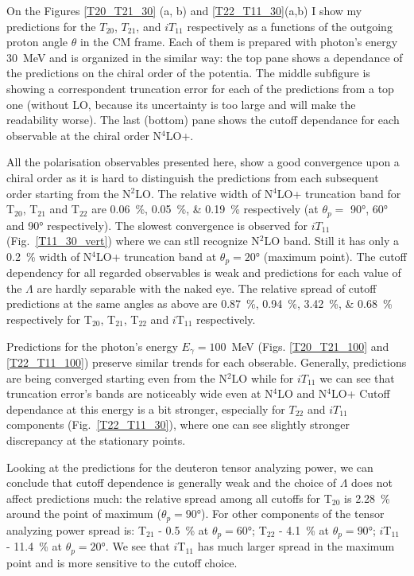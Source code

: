     On the Figures \ref{T20_T21_30} (a, b) and \ref{T22_T11_30}(a,b)
    I show my predictions for the
    $T_{20}$, $T_{21}$,  and $iT_{11}$ respectively as a functions 
    of the outgoing proton angle $\theta$ in the CM frame. Each of them
    is prepared with photon's energy 30~MeV and is
    organized in the similar way: the top
    pane shows a dependance of the predictions on the 
    chiral order of the potentia. The middle subfigure is
    showing a correspondent truncation error for each of the 
    predictions from a top one (without LO, because its uncertainty is
    too large and will make the readability worse). The last (bottom)
    pane shows the cutoff dependance for each observable at the chiral
    order N$^4$LO+. 

    All the polarisation observables presented here, show a good convergence 
    upon a chiral order as it is hard to distinguish the predictions
    from each subsequent order starting from the N$^2$LO.
    The relative width of N$^4$LO+ truncation band 
    for T$_{20}$, T$_{21}$ and T$_{22}$
    are \SIlist{0.06; 0.05; 0.19}{\percent} respectively (at $\theta_p=$ \ang{90}, \ang{60} and \ang{90} respectively).
    The slowest convergence is observed for $iT_{11}$ (Fig.~\ref{T11_30_vert})
    where we can stll recognize N$^2$LO band.
    Still it has only a \SI{0.2}{\percent}
    width of N$^4$LO+ truncation band at $\theta_p = \ang{20}$ (maximum point).
    The cutoff dependency for all regarded observables is weak and 
    predictions for each value of the $\Lambda$ are hardly separable 
    with the naked eye.
    The relative spread of cutoff predictions at the same angles as above 
    are \SIlist{0.87; 0.94; 3.42; 0.68}{\percent} respectively for T$_{20}$, T$_{21}$, T$_{22}$ and $i\text{T}_{11}$ respectively.


    Predictions for the photon's energy $E_\gamma = 100$~MeV
    (Figs. \ref{T20_T21_100} and \ref{T22_T11_100}) preserve similar
    trends for each obserable. 
    Generally, predictions are being converged starting
    even from the N$^2$LO while for $iT_{11}$
    we can see 
    that truncation error's bands are noticeably wide
    even at N$^4$LO and N$^4$LO+
    Cutoff dependance at this energy is a bit stronger, especially
    for 
    $T_{22}$ and $iT_{11}$ components (Fig.~\ref{T22_T11_30}),
    where one can see 
    slightly stronger discrepancy at the stationary points.
    
    Looking at the predictions for the deuteron tensor analyzing power,
    we can conclude that cutoff dependence is generally weak
    and the choice of $\Lambda$ does not affect predictions much:
    the relative spread among all cutoffs for T$_{20}$ is \SI{2.28}{\percent}
    around the point of maximum ($\theta_p = \ang{90}$).
    For other components of the tensor analyzing power spread is:
    T$_{21}$ - \SI{0.5}{\percent} at $\theta_p = \ang{60}$;
    T$_{22}$ - \SI{4.1}{\percent} at $\theta_p = \ang{90}$;
    $i$T$_{11}$ - \SI{11.4}{\percent} at $\theta_p = \ang{20}$. We see that $i$T$_{11}$ has much larger spread in the maximum point and is more sensitive to the cutoff choice.

